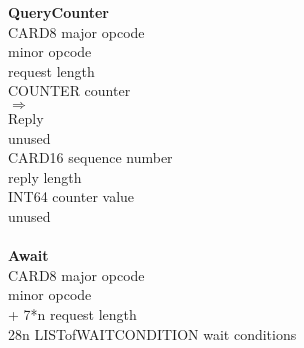 \begin{tabbing}
\tabstopsC
{\bf QueryCounter}\\
		\> CARD8	\> major opcode \\
				\> minor opcode\footnotemark[1] \\
	\> 2			\> request length \\
		\> COUNTER	\> counter \\
$\Rightarrow$\\
	\> 1			\> Reply \\
		\>		\> unused \\
		\> CARD16	\> sequence number \\
				\> reply length \\
		\> INT64	\> counter value \\
		\>		\> unused\\
\\
{\bf Await}\\
		\> CARD8	\> major opcode \\
				\> minor opcode\footnotemark[1] \\
		 + 7*n	\> request length \\
	\> 28n	\> LISTofWAITCONDITION \> wait conditions
\end{tabbing}
\setlength{\topsep}{0pt}	%
